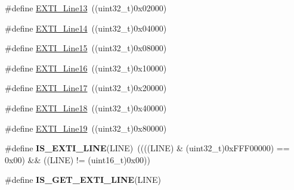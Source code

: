 \begin{DoxyCompactItemize}
\item 
\#define \hyperlink{group__EXTI__Lines_gae382388ac34b78917a7bd06562e35c42}{EXTI\_\-Line13}~((uint32\_\-t)0x02000)
\item 
\#define \hyperlink{group__EXTI__Lines_ga7b3821ad1b7a00b49c27075688f48101}{EXTI\_\-Line14}~((uint32\_\-t)0x04000)
\item 
\#define \hyperlink{group__EXTI__Lines_gafc5ea85d1fc095a855fde8977a338c4c}{EXTI\_\-Line15}~((uint32\_\-t)0x08000)
\item 
\#define \hyperlink{group__EXTI__Lines_ga21326db7db8ca614c746b7f52dc45ead}{EXTI\_\-Line16}~((uint32\_\-t)0x10000)
\item 
\#define \hyperlink{group__EXTI__Lines_ga3e0fc18bc0722adc09605e3093b24c6a}{EXTI\_\-Line17}~((uint32\_\-t)0x20000)
\item 
\#define \hyperlink{group__EXTI__Lines_ga6cdf346a3e7a3c8dbb036aca6741207c}{EXTI\_\-Line18}~((uint32\_\-t)0x40000)
\item 
\#define \hyperlink{group__EXTI__Lines_ga49ac0744621f88d432d85838483ad1de}{EXTI\_\-Line19}~((uint32\_\-t)0x80000)
\item 
\hypertarget{group__EXTI__Lines_gaade8b8717a1d78f83d3cf180e2817557}{
\#define {\bfseries IS\_\-EXTI\_\-LINE}(LINE)~((((LINE) \& (uint32\_\-t)0xFFF00000) == 0x00) \&\& ((LINE) != (uint16\_\-t)0x00))}
\label{group__EXTI__Lines_gaade8b8717a1d78f83d3cf180e2817557}

\item 
\#define {\bfseries IS\_\-GET\_\-EXTI\_\-LINE}(LINE)
\end{DoxyCompactItemize}


